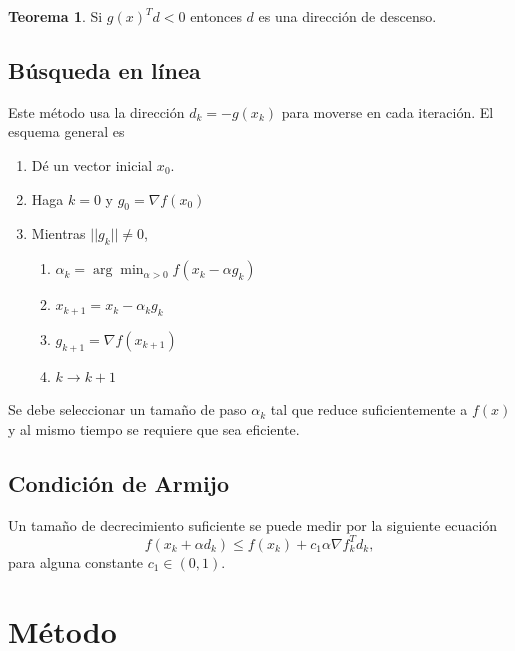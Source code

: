 \documentclass[11pt,letterpaper]{article}
\theoremstyle{definition}
\theoremstyle{definition}
\newtheorem{teo}{Teorema}[section]%
\theoremstyle{definition}
\begin{document}
\begin{shaded*}
	\begin{teo}
		Si $ g(x)^T d < 0 $ entonces $ d $ es una dirección de descenso.
	\end{teo}
\end{shaded*}


\subsection{Búsqueda en línea}
Este método usa la dirección $ d_k = - g(x_k) $ para moverse en cada iteración. El esquema general es
\begin{shaded*}
	\begin{enumerate}
	\item Dé un vector inicial $ x_0 $.
	\item Haga $ k = 0 $ y $ g_0 = \nabla f(x_0) $
	\item Mientras $ || g_k || \neq 0 $, 
	\begin{enumerate}
		\item $ \alpha_k = \displaystyle\arg \min_{\alpha >0} f(x_k - \alpha g_k) $
		\item $ x_{k+1} = x_k - \alpha_k g_k $
		\item $ g_{k+1} = \nabla f (x_{k+1}) $
		\item $ k \to k + 1 $
	\end{enumerate}
\end{enumerate}
\end{shaded*}
Se debe seleccionar un tamaño de paso $ \alpha_k $ tal que reduce suficientemente a $ f(x) $ y al mismo tiempo se requiere que sea eficiente.

\subsection{Condición de Armijo}
\begin{shaded*}
Un tamaño de decrecimiento suficiente se puede medir por la siguiente ecuación
\[  f(x_k + \alpha d_k) \leq f(x_k) + c_1 \alpha \nabla f_k^T d_k, \]
para alguna constante $ c_1 \in (0,1) $.
\end{shaded*}

\section{Método}
\end{document}
